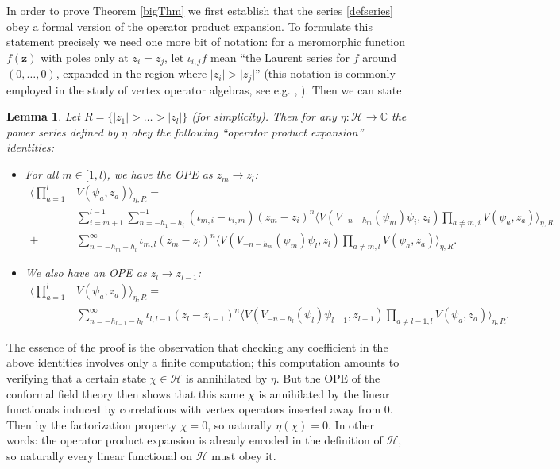 \documentclass[a4paper,12pt]{article}
\newcommand{\C}{{\mathbb C}}
\newcommand{\zz}{{\mathbf z}}
\newcommand{\F}{{\mathcal H}}
\newcommand{\abs}[1]{\lvert#1\rvert}
\newcommand{\IP}[1]{\langle#1\rangle}
\newtheorem{lem}[defn]{Lemma}
\newcommand{\oproof}[1]{\noindent {\bf Proof#1.\ }}
\begin{document}
In order to prove Theorem \ref{bigThm} we first
establish that the series \eqref{defseries} obey a formal version of the operator product expansion.  To
formulate this statement precisely we need one more bit of notation:  for a meromorphic function $f(\zz)$
with poles only at $z_i = z_j$, let $\iota_{i,j} f$ mean ``the Laurent
series for $f$ around $(0, \dots, 0)$, expanded in the region where $\abs{z_i} > \abs{z_j}$'' (this
notation is commonly employed in the study of vertex operator algebras, see e.g. \cite{Kac}, \cite{FLM}).
Then we can state
\begin{lem} \label{opelem} Let $R = \{\abs{z_1} > \dots > \abs{z_l}\}$ (for simplicity).
Then for any $\eta: \F \to \C$ the power series defined by $\eta$ obey the following ``operator
product expansion'' identities:
\begin{itemize}
\item For all $m\in[1,l)$, we have the OPE as $z_m \to z_l$:
\begin{equation} \label{ope}
\begin{split}
\IP{\prod_{a=1}^l & V(\psi_a, z_a)}_{\eta,R} =  \\
 & \sum_{i=m+1}^{l-1} \sum_{n = - h_1 - h_i}^{-1} (\iota_{m,i} - \iota_{i,m}) (z_m - z_i)^{n} \IP{V(V_{-n-h_m}(\psi_m) \psi_i, z_i) \prod_{a \ne m,i} V(\psi_a, z_a)}_{\eta,R} \\
+ &\sum_{n = -h_m - h_l}^\infty \iota_{m,l} (z_m - z_l)^n \IP{V(V_{-n-h_m}(\psi_m) \psi_l, z_l) \prod_{a \ne m,l} V(\psi_a, z_a)}_{\eta,R}.
\end{split}
\end{equation}
\item We also have an OPE as $z_l \to z_{l-1}$:
\begin{equation} \label{opeshort}
\begin{split}
\IP{\prod_{a=1}^l & V(\psi_a, z_a)}_{\eta,R} = \\
&\sum_{n = -h_{l-1} - h_l}^\infty \iota_{l,{l-1}} (z_l - z_{l-1})^n \IP{V(V_{-n-h_l}(\psi_l) \psi_{l-1}, z_{l-1}) \prod_{a \ne {l-1},l} V(\psi_a, z_a)}_{\eta,R}.
\end{split}
\end{equation}
\end{itemize}
\end{lem}

\oproof{} The essence of the proof is the observation that checking any coefficient in the above identities involves
only a finite computation; this computation amounts to verifying that a 
certain state $\chi \in \F$ is annihilated by $\eta$.  But the
OPE of the conformal field theory then shows that 
this same $\chi$ is annihilated by the linear functionals induced by correlations with vertex operators inserted
away from $0$.  Then by the factorization property $\chi = 0$, so naturally $\eta(\chi) = 0$.
In other words:
the operator product expansion is already encoded in 
the definition of $\F$, so naturally every linear functional on $\F$ must obey it.
\end{document}
